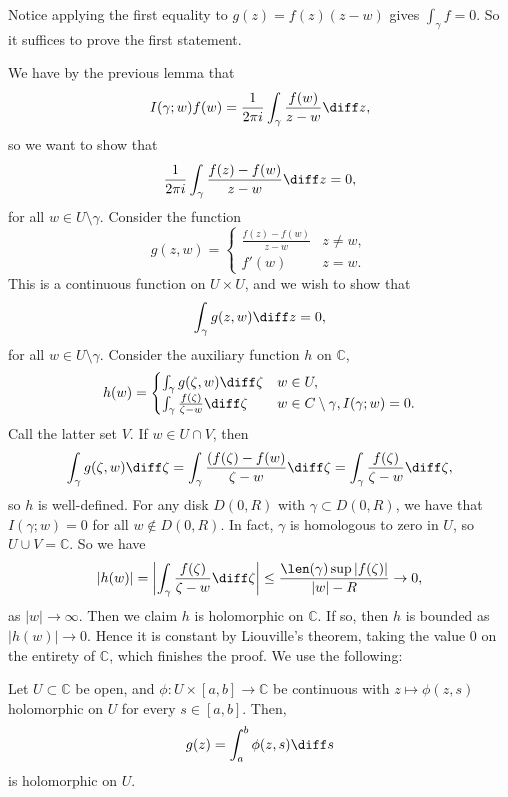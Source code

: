 \documentclass[12pt]{article}
\begin{document}
\begin{proofbox}
	Notice applying the first equality to $g(z) = f(z)(z-w)$ gives $\int_{\gamma} f = 0$. So it suffices to prove the first statement.

	We have by the previous lemma that
	\[
	I(\gamma;w)f(w) = \frac{1}{2 \pi i} \int_{\gamma} \frac{f(w)}{z - w} \diff z
	,\]
	so we want to show that
	\[
	\frac{1}{2 \pi i} \int_{\gamma} \frac{f(z) - f(w)}{z - w} \diff z = 0
	,\]
	for all $w \in U\setminus \gamma$. Consider the function
	\[
	g(z, w) =
	\begin{cases}
		\frac{f(z) - f(w)}{z - w} & z \neq w, \\
		f'(w) & z = w.
	\end{cases}
	\]
	This is a continuous function on $U \times U$, and we wish to show that
	\[
	\int_{\gamma}g(z, w) \diff z = 0
	,\]
	for all $w \in U \setminus \gamma$. Consider the auxiliary function $h$ on $\mathbb{C}$,
	\[
	h(w)=
	\begin{cases}
		\int_{\gamma} g(\zeta, w) \diff \zeta & w \in U, \\
		\int_{\gamma} \frac{f(\zeta)}{\zeta - w} \diff \zeta & w \in C\setminus \gamma, I(\gamma;w) = 0.
	\end{cases}
	\]
	Call the latter set $V$. If $w \in U \cap V$, then
	\[
	\int_{\gamma}g(\zeta, w) \diff \zeta = \int_{\gamma} \frac{(f(\zeta) - f(w)}{\zeta - w} \diff \zeta = \int_{\gamma} \frac{f(\zeta)}{\zeta - w} \diff \zeta,
	\]
	so $h$ is well-defined. For any disk $D(0,R)$ with $\gamma \subset D(0,R)$, we have that $I(\gamma;w) = 0$ for all $w \not \in D(0,R)$. In fact, $\gamma$ is homologous to zero in $U$, so $U \cup V = \mathbb{C}$. So we have
	\[
	|h(w)| = \biggl| \int_{\gamma} \frac{f(\zeta)}{\zeta - w} \diff \zeta \biggr| \leq \frac{\len(\gamma) \sup |f(\zeta)|}{|w| - R} \to 0,
	\]
	as $|w| \to \infty$. Then we claim $h$ is holomorphic on $\mathbb{C}$. If so, then $h$ is bounded as $|h(w)| \to 0$. Hence it is constant by Liouville's theorem, taking the value $0$ on the entirety of $\mathbb{C}$, which finishes the proof. We use the following:

	\begin{lemma}
		Let $U \subset \mathbb{C}$ be open, and $\phi : U \times [a, b] \to \mathbb{C}$ be continuous with $z \mapsto \phi(z, s)$ holomorphic on $U$ for every $s \in [a, b]$. Then,
		\[
		g(z) = \int_{a}^{b} \phi(z, s) \diff s
		\]
		is holomorphic on $U$.
	\end{lemma}
	

\end{proofbox}
\end{document}

